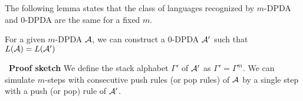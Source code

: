 

The following lemma states that
the class of languages recognized by $m$-DPDA and $0$-DPDA are the same
for a fixed $m$.
\begin{lemma}
\label{lem: ef}
For a given $m$-DPDA ${\cal A}$,
we can construct a $0$-DPDA ${\cal A}'$ such that
$L({\cal A})=L({\cal A}')$
\end{lemma}\
{\bf Proof sketch}\quad
We define the stack alphabet $\Gamma'$ of ${\cal A}'$ as $\Gamma'=\Gamma^m$.
We can simulate $m$-steps with consecutive push rules (or pop rules) of ${\cal A}$
by a single step with a push (or pop) rule of ${\cal A}'$.


